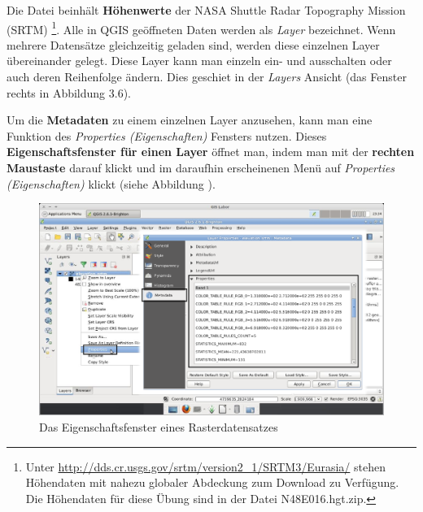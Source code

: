 \documentclass[a4paper,12pt,ngerman]{sphinxmanual}
\begin{document}
Die Datei  beinhält \textbf{Höhenwerte} der NASA Shuttle Radar Topography Mission (SRTM) \footnote{
Unter \href{http://dds.cr.usgs.gov/srtm/version2\_1/SRTM3/Eurasia/}{http://dds.cr.usgs.gov/srtm/version2\_1/SRTM3/Eurasia/} stehen Höhendaten mit nahezu globaler Abdeckung zum Download zu Verfügung. Die Höhendaten für diese Übung sind in der Datei N48E016.hgt.zip.
}.
Alle in QGIS geöffneten Daten werden als \emph{Layer} bezeichnet. Wenn mehrere Datensätze gleichzeitig geladen sind, werden diese einzelnen Layer übereinander gelegt. Diese Layer kann man einzeln ein- und ausschalten oder auch deren Reihenfolge ändern. Dies geschiet in der \emph{Layers} Ansicht (das Fenster rechts in Abbildung 3.6).

Um die \textbf{Metadaten} zu einem einzelnen Layer anzusehen, kann man eine Funktion des \emph{Properties (Eigenschaften)} Fensters nutzen. Dieses \textbf{Eigenschaftsfenster für einen Layer} öffnet man, indem man mit der \textbf{rechten Maustaste} darauf klickt und im daraufhin erscheinenen Menü auf \emph{Properties (Eigenschaften)} klickt (siehe Abbildung ).
\begin{figure}[htbp]
\centering
\capstart

\includegraphics{qgis_properties.png}
\caption{Das Eigenschaftsfenster eines Rasterdatensatzes}\label{uebung2:figsprop}\end{figure}
\end{document}

